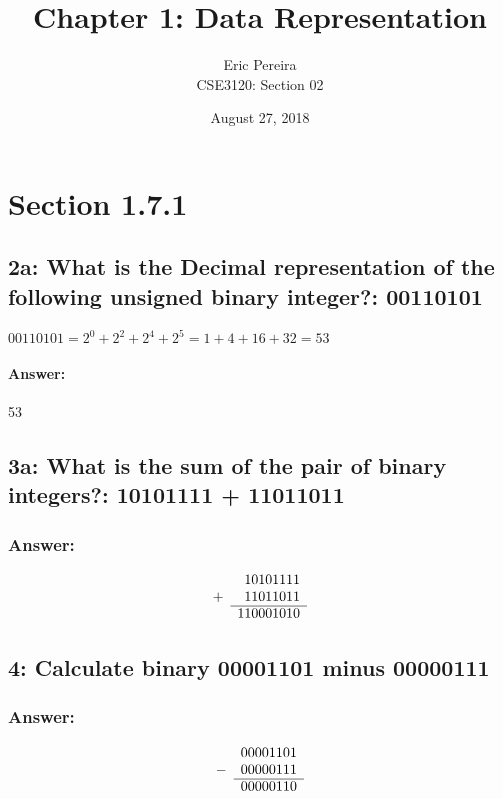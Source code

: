 \documentclass[12pt]{article}
\begin{document}
\author{Eric Pereira\\
	CSE3120: Section 02}
\date{August 27, 2018}
\title{Chapter 1: Data Representation}
\maketitle
\section*{Section 1.7.1}
\subsection*{2a: What is the Decimal representation of the following unsigned binary integer?: 00110101}
\begin{center}
$00110101 = 2^0 + 2^2 + 2^4 + 2^5 = 1 + 4 + 16 + 32 = 53$
\end{center}
\paragraph*{Answer:} 53

\subsection*{3a: What is the sum of the pair of binary integers?: 10101111 + 11011011}
\subsubsection*{Answer:}
\[
\begin{array} {@{}cr}
	& 10101111 \\
   +& 11011011 \\
   \cline{2-2} 
    & 110001010   
  \end{array}	
  \]
  
\subsection*{4: Calculate binary 00001101 minus 00000111}
\subsubsection*{Answer:}
\[
\begin{array} {@{}cr}
& 00001101 \\
-& 00000111 \\
\cline{2-2} 
& 00000110
\end{array}	
\]
\end{document}
